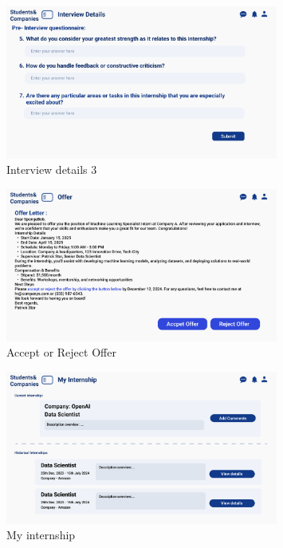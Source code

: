 \begin{figure}[H]
    \centering
    \includegraphics[width=0.8\textwidth]{Images/UI/Interview Details3-student.png}
    \caption{Interview details 3}\label{fig:Interview details 3}
\end{figure}

\begin{figure}[H]
    \centering
    \includegraphics[width=0.8\textwidth]{Images/UI/Reject-student.png}
    \caption{Accept or Reject Offer }\label{fig:Accept or Reject Offer}
\end{figure}

\begin{figure}[H]
    \centering
    \includegraphics[width=0.8\textwidth]{Images/UI/My Internship-student.png}
    \caption{My internship }\label{fig:My internship}
\end{figure}

